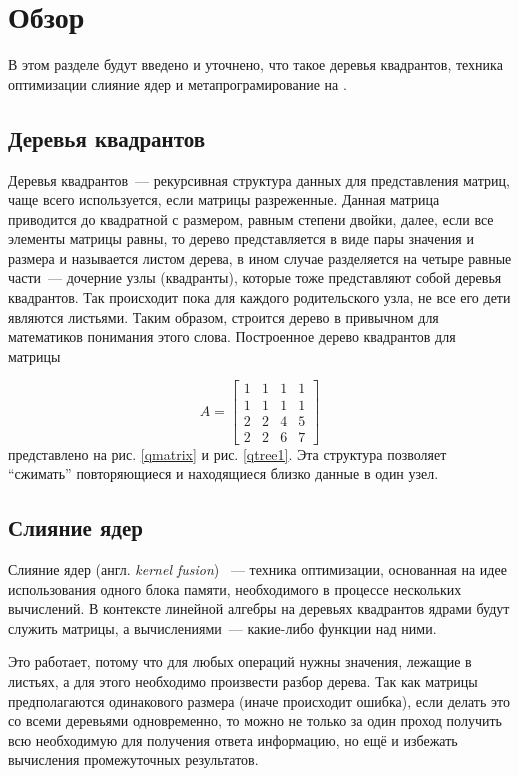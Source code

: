 
\section{Обзор}
В этом разделе будут введено и уточнено, что такое деревья квадрантов, техника оптимизации слияние ядер и метапрограмирование на \Th{}.
\subsection{Деревья квадрантов}
Деревья квадрантов~--- рекурсивная структура данных для представления
матриц, чаще всего используется, если матрицы разреженные.
Данная матрица приводится до квадратной с размером, равным степени двойки, далее, если все элементы матрицы равны, то дерево представляется в виде пары значения и размера и  называется листом дерева, в ином случае разделяется на четыре равные части~--- дочерние узлы (квадранты), которые тоже представляют собой деревья квадрантов.
Так происходит пока для каждого родительского узла, не все его дети являются листьями.
Таким образом, строится дерево в привычном для математиков понимания этого слова.
Построенное дерево квадрантов для матрицы

\begin{equation*}
    A =
    \begin{bmatrix}
        1 & 1 &1 & 1\\
        1 & 1 &1 & 1\\
        2 & 2& 4 & 5 \\
        2 & 2 & 6 & 7
    \end{bmatrix}
\end{equation*}
представлено на рис. \ref{qmatrix} и рис. \ref{qtree1}.
Эта структура позволяет \enquote{сжимать} повторяющиеся и находящиеся близко данные в один узел.

\newpage
\subsection{Слияние ядер}
Слияние ядер (англ. \textit{kernel fusion}) ~--- техника оптимизации, основанная на идее использования одного блока памяти, необходимого в процессе нескольких вычислений.
В контексте линейной алгебры на деревьях квадрантов ядрами будут служить матрицы, а вычислениями~--- какие-либо функции над ними.

Это работает, потому что для любых операций нужны значения, лежащие в листьях, а для этого необходимо произвести разбор дерева.
Так как матрицы предполагаются одинакового размера (иначе происходит ошибка), если делать это со всеми деревьями одновременно, то можно не только за один проход получить всю необходимую для получения ответа информацию, но ещё и избежать вычисления промежуточных результатов.
